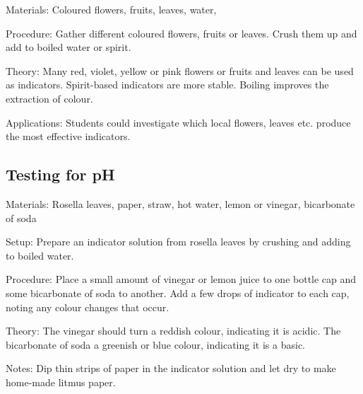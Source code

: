 \begin{multicols}{2}
\begin{description*}
\item[Materials:]{Coloured flowers, fruits, leaves, water, }
\item[Procedure:]{Gather different coloured flowers, fruits or leaves. Crush them up and add to boiled water or spirit.}
\item[Theory:]{Many red, violet, yellow or pink flowers or fruits and leaves can be used
as indicators. Spirit-based indicators are more stable. Boiling improves the extraction
of colour. }
\item[Applications:]{Students could investigate which local flowers, leaves etc. produce the
most effective indicators.}
\end{description*}

\subsection{Testing for pH} %


\begin{description*}
\item[Materials:]{Rosella leaves, paper, straw, hot water, lemon or vinegar, bicarbonate of soda}
\item[Setup:]{Prepare an indicator solution from rosella leaves by crushing and adding to boiled water.}
\item[Procedure:]{Place a small amount of vinegar or lemon juice to one bottle cap and some bicarbonate of soda to another. Add a few drops of indicator to each cap, noting any colour changes that occur.}
\item[Theory:]{The vinegar should turn a reddish colour, indicating it is acidic. The bicarbonate of soda a greenish or blue colour, indicating it is a basic.}
\item[Notes:]{Dip thin strips of paper in the indicator solution and let dry to make home-made litmus paper.}
\end{description*}


\end{multicols}
